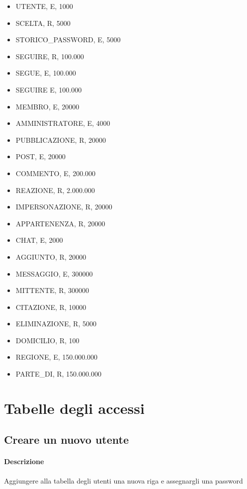 \documentclass[a4paper,12pt]{report}
\begin{document}
\begin{itemize}
  \item UTENTE, E, 1000
  \item SCELTA, R, 5000
  \item STORICO\_PASSWORD, E, 5000
  \item SEGUIRE, R, 100.000
  \item SEGUE, E, 100.000
  \item SEGUIRE E, 100.000
  \item MEMBRO, E, 20000
  \item AMMINISTRATORE, E, 4000
  \item PUBBLICAZIONE, R, 20000
  \item POST, E, 20000
  \item COMMENTO, E, 200.000
  \item REAZIONE, R, 2.000.000
  \item IMPERSONAZIONE, R, 20000
  \item APPARTENENZA, R, 20000
  \item CHAT, E, 2000 
  \item AGGIUNTO, R, 20000 
  \item MESSAGGIO, E, 300000
  \item MITTENTE, R, 300000
  \item CITAZIONE, R, 10000
  \item ELIMINAZIONE, R, 5000
  \item DOMICILIO, R, 100
  \item REGIONE, E, 150.000.000
  \item PARTE\_DI, R, 150.000.000

\end{itemize}

\section{Tabelle degli accessi}

\subsection{Creare un nuovo utente} \label{nuovo_utente}
\paragraph{Descrizione} Aggiungere alla tabella degli utenti una nuova riga e assegnargli una password 
\end{document}
